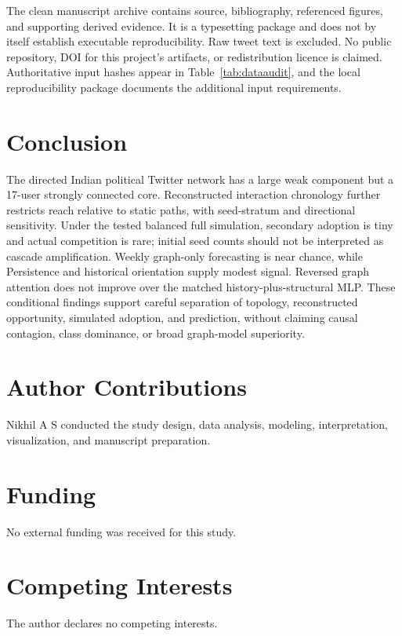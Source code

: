 \documentclass[11pt,a4paper]{article}
\begin{document}
The clean manuscript archive contains source, bibliography, referenced figures, and supporting derived evidence. It is a typesetting package and does not by itself establish executable reproducibility. Raw tweet text is excluded. No public repository, DOI for this project's artifacts, or redistribution licence is claimed. Authoritative input hashes appear in Table~\ref{tab:dataaudit}, and the local reproducibility package documents the additional input requirements.

\section{Conclusion}
The directed Indian political Twitter network has a large weak component but a 17-user strongly connected core. Reconstructed interaction chronology further restricts reach relative to static paths, with seed-stratum and directional sensitivity. Under the tested balanced full simulation, secondary adoption is tiny and actual competition is rare; initial seed counts should not be interpreted as cascade amplification. Weekly graph-only forecasting is near chance, while Persistence and historical orientation supply modest signal. Reversed graph attention does not improve over the matched history-plus-structural MLP. These conditional findings support careful separation of topology, reconstructed opportunity, simulated adoption, and prediction, without claiming causal contagion, class dominance, or broad graph-model superiority.

\section*{Author Contributions}
Nikhil A S conducted the study design, data analysis, modeling, interpretation, visualization, and manuscript preparation.
\section*{Funding}
No external funding was received for this study.
\section*{Competing Interests}
The author declares no competing interests.
\nocite{*}
\begingroup\small\setlength{\bibsep}{4pt}


\endgroup
\end{document}
